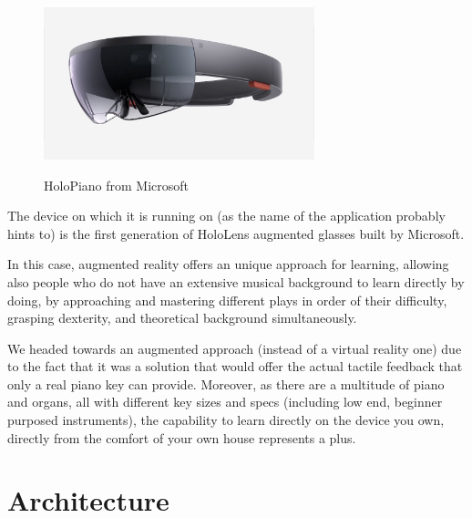 \documentclass[12 pct]{report}
\begin{document}
\begin{figure}[H]
\includegraphics[width=0.7\textwidth]{hololens}
\centering
\label{fig:hololens}
\caption{HoloPiano from Microsoft}
\end{figure}



The device on which it is running on (as the name of the application probably hints to) is the first generation of HoloLens augmented glasses built by Microsoft.


In this case, augmented reality offers an unique approach for learning, allowing also people who do not have an extensive musical background to learn directly by doing, by approaching and mastering different plays in order of their difficulty, grasping dexterity, and theoretical background simultaneously.

We headed towards an augmented approach (instead of a virtual reality one) due to the fact that it was a solution that would offer the actual tactile feedback that only a real piano key can provide. Moreover, as there are a multitude of piano and organs, all with different key sizes and specs (including low end, beginner purposed instruments), the capability to learn directly on the device you own, directly from the comfort of your own house represents a plus.

\section{Architecture}
\end{document}
